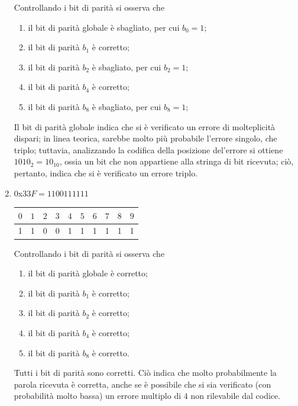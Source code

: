 \documentclass[a4paper]{extarticle}
\renewcommand\arraystretch{}
\begin{document}
\begin{enumerate}
    \vspace{1em}
    \noindent
    Controllando i bit di parità si osserva che
    \begin{enumerate}
        \item il bit di parità globale è sbagliato, per cui $b_0=1$;
        \item il bit di parità $b_1$ è corretto;
        \item il bit di parità $b_2$ è sbagliato, per cui $b_2=1$;
        \item il bit di parità $b_4$ è corretto;
        \item il bit di parità $b_8$ è sbagliato, per cui $b_8=1$; 
    \end{enumerate}
    Il bit di parità globale indica che si è verificato un errore di molteplicità dispari; in linea teorica, sarebbe molto più probabile l'errore singolo, che triplo; tuttavia, analizzando la codifica della posizione del'errore si ottiene $1010_2=10_{10}$, ossia un bit che non appartiene alla stringa di bit ricevuta; ciò, pertanto, indica che si è verificato un errore triplo.

    \item $0$x$33F = 11 0011 1111$

    \noindent
    \begin{table}[H]
    \setlength{\tabcolsep}{4pt}
    \renewcommand{\arraystretch}{1}
    \centering
    \begin{tabular}{|c|c|c|c|c|c|c|c|c|c|}
        \hline
        $0$ & $1$ & $2$ & $3$ & $4$ & $5$ & $6$ & $7$ & $8$ & $9$\\
        \hline
        \cellcolor{orange!75!white}1 & \cellcolor{orange!25!white}1 &\cellcolor{orange!25!white}0 & 0 & \cellcolor{orange!25!white}1 & 1 & 1 & 1 & \cellcolor{orange!25!white}1 & 1\\
        \hline
    \end{tabular}
    \end{table}

    \vspace{1em}
    \noindent
    Controllando i bit di parità si osserva che
    \begin{enumerate}
        \item il bit di parità globale è corretto;
        \item il bit di parità $b_1$ è corretto;
        \item il bit di parità $b_2$ è corretto;
        \item il bit di parità $b_4$ è corretto;
        \item il bit di parità $b_8$ è corretto.
    \end{enumerate}
    Tutti i bit di parità sono corretti. Ciò indica che molto probabilmente la parola ricevuta è corretta, anche se è possibile che si sia verificato (con probabilità molto bassa) un errore multiplo di $4$ non rilevabile dal codice.
\end{enumerate}
\end{document}
